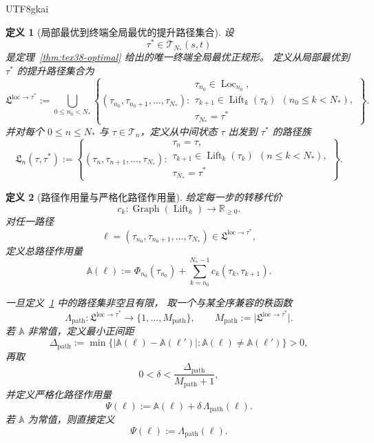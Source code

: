 \documentclass[12pt]{article}
\newtheorem{definition}{定义}[section]
\newcommand{\RR}{\mathbb{R}}
\newcommand{\Lift}{\operatorname{Lift}}
\begin{document}
\begin{CJK*}{UTF8}{gkai}
\begin{definition}[局部最优到终端全局最优的提升路径集合]
\label{def:tex38-liftpath-family}
设
\[
  \tau^\ast\in\mathcal T_{N_\ast}(s,t)
\]
是定理~\ref{thm:tex38-optimal} 给出的唯一终端全局最优正规形。
定义从局部最优到 $\tau^\ast$ 的提升路径集合为
\[
  \mathfrak L^{\mathrm{loc}\to\tau^\ast}
  :=
  \bigcup_{0\le n_0<N_\ast}
  \left\{
    (\tau_{n_0},\tau_{n_0+1},\dots,\tau_{N_\ast}) :
    \begin{array}{l}
      \tau_{n_0}\in\operatorname{Loc}_{n_0},\\
      \tau_{k+1}\in\Lift_k(\tau_k)\ \ (n_0\le k<N_\ast),\\
      \tau_{N_\ast}=\tau^\ast
    \end{array}
  \right\}.
\]
并对每个 $0\le n\le N_\ast$ 与 $\tau\in\mathcal T_n$，定义从中间状态 $\tau$ 出发到 $\tau^\ast$ 的路径族
\[
  \mathfrak L_n(\tau,\tau^\ast)
  :=
  \left\{
    (\tau_n,\tau_{n+1},\dots,\tau_{N_\ast}) :
    \begin{array}{l}
      \tau_n=\tau,\\
      \tau_{k+1}\in\Lift_k(\tau_k)\ \ (n\le k<N_\ast),\\
      \tau_{N_\ast}=\tau^\ast
    \end{array}
  \right\}.
\]
\end{definition}

\begin{definition}[路径作用量与严格化路径作用量]
\label{def:tex38-liftpath-action}
给定每一步的转移代价
\[
  c_k:\operatorname{Graph}(\Lift_k)\to\RR_{\ge 0}.
\]
对任一路径
\[
  \ell=(\tau_{n_0},\tau_{n_0+1},\dots,\tau_{N_\ast})
  \in
  \mathfrak L^{\mathrm{loc}\to\tau^\ast},
\]
定义总路径作用量
\[
  \mathbb A(\ell)
  :=
  \Phi_{n_0}(\tau_{n_0})
  +
  \sum_{k=n_0}^{N_\ast-1}c_k(\tau_k,\tau_{k+1}).
\]

一旦定义~\ref{def:tex38-liftpath-family} 中的路径集非空且有限，
取一个与某全序兼容的秩函数
\[
  \Lambda_{\mathrm{path}}:
  \mathfrak L^{\mathrm{loc}\to\tau^\ast}
  \to
  \{1,\dots,M_{\mathrm{path}}\},
  \qquad
  M_{\mathrm{path}}
  :=
  \bigl|\mathfrak L^{\mathrm{loc}\to\tau^\ast}\bigr|.
\]
若 $\mathbb A$ 非常值，定义最小正间距
\[
  \Delta_{\mathrm{path}}
  :=
  \min\bigl\{
    |\mathbb A(\ell)-\mathbb A(\ell')|:
    \mathbb A(\ell)\neq \mathbb A(\ell')
  \bigr\}>0,
\]
再取
\[
  0<\delta<\frac{\Delta_{\mathrm{path}}}{M_{\mathrm{path}}+1},
\]
并定义严格化路径作用量
\[
  \Psi(\ell)
  :=
  \mathbb A(\ell)+\delta\,\Lambda_{\mathrm{path}}(\ell).
\]
若 $\mathbb A$ 为常值，则直接定义
\[
  \Psi(\ell):=\Lambda_{\mathrm{path}}(\ell).
\]
\end{definition}


\end{CJK*}
\end{document}
